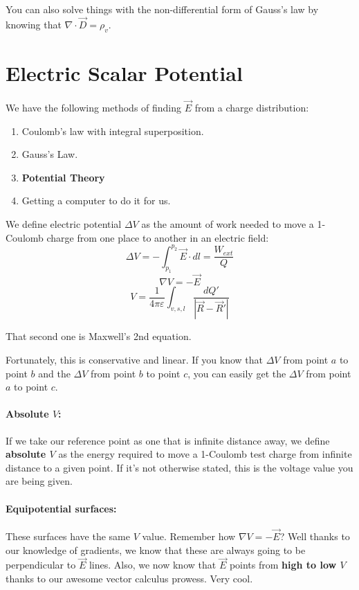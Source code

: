 \documentclass[a4paper,12pt]{report}
\begin{document}
You can also solve things with the non-differential form of Gauss's law by knowing that $\nabla\cdot \vec{D} = \rho_v$.

\section{Electric Scalar Potential}
We have the following methods of finding $\vec{E}$ from a charge distribution:
\begin{enumerate}
\item Coulomb's law with integral superposition.
\item Gauss's Law.
\item \textbf{Potential Theory}
\item Getting a computer to do it for us. 
\end{enumerate}

We define electric potential $\Delta V$ as the amount of work needed to move a 1-Coulomb charge from 
one place to another in an electric field: 
$$\Delta V = -\int_{p_1}^{p_2} \vec{E} \cdot dl = \frac{W_{ext}}{Q}$$
$$\nabla V = -\vec{E}$$
$$V = \frac{1}{4\pi\varepsilon} \int_{v, s, l} \frac{dQ'}{|\vec{R} - \vec{R}'|}$$


That second one is Maxwell's 2nd equation. 

Fortunately, this is conservative and linear. If you know that $\Delta V$ from point $a$ to point $b$ and the 
$\Delta V$ from point $b$ to point $c$, you can easily get the $\Delta V$ from point $a$ to point $c$.

\paragraph{Absolute $V$: } If we take our reference point as one that is infinite distance away, we define 
\textbf{absolute $V$} as the energy required to move a 1-Coulomb test charge from infinite distance to a given 
point. If it's not otherwise stated, this is the voltage value you are being given. 

\paragraph{Equipotential surfaces: } These surfaces have the same $V$ value. Remember how $\nabla V = -\vec{E}$? 
Well thanks to our knowledge of gradients, we know that these are always going to be perpendicular to $\vec{E}$ 
lines. Also, we now know that $\vec{E}$ points from \textbf{high to low $V$} thanks to our awesome vector calculus 
prowess. Very cool. 
\end{document}
